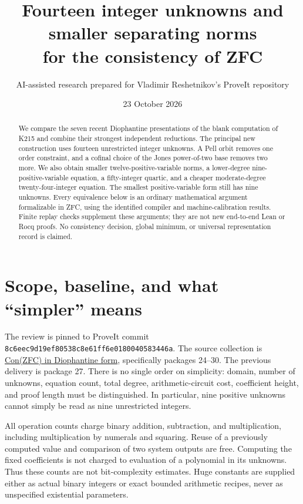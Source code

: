 \documentclass[11pt]{article}
\title{Fourteen integer unknowns and smaller separating norms\\for the consistency of ZFC}
\author{AI-assisted research prepared for Vladimir Reshetnikov's ProveIt repository}
\date{23 October 2026}
\begin{document}
\maketitle
\begin{abstract}
We compare the seven recent Diophantine presentations of the blank computation of K215 and combine their strongest independent reductions. The principal new construction uses fourteen unrestricted integer unknowns. A Pell orbit removes one order constraint, and a cofinal choice of the Jones power-of-two base removes two more. We also obtain smaller twelve-positive-variable norms, a lower-degree nine-positive-variable equation, a fifty-integer quartic, and a cheaper moderate-degree twenty-four-integer equation. The smallest positive-variable form still has nine unknowns. Every equivalence below is an ordinary mathematical argument formalizable in ZFC, using the identified compiler and machine-calibration results. Finite replay checks supplement these arguments; they are not new end-to-end Lean or Rocq proofs. No consistency decision, global minimum, or universal representation record is claimed.
\end{abstract}

\section{Scope, baseline, and what ``simpler'' means}
The review is pinned to ProveIt commit
\texttt{8c6eec9d19ef80538c8e61ff6e0180040583446a}.
The source collection is
\href{https://github.com/VladimirReshetnikov/ProveIt/tree/8c6eec9d19ef80538c8e61ff6e0180040583446a/SetTheory/Cardinals/docs/reports/hilbert-tenth-problem/con-zfc-diophantine-forms}{Con(ZFC) in Diophantine form}, specifically packages 24--30.
The previous delivery is package 27. There is no single order on simplicity: domain, number of unknowns, equation count, total degree, arithmetic-circuit cost, coefficient height, and proof length must be distinguished. In particular, nine positive unknowns cannot simply be read as nine unrestricted integers.

All operation counts charge binary addition, subtraction, and multiplication, including multiplication by numerals and squaring. Reuse of a previously computed value and comparison of two system outputs are free. Computing the fixed coefficients is not charged to evaluation of a polynomial in its unknowns. Thus these counts are not bit-complexity estimates. Huge constants are supplied either as actual binary integers or exact bounded arithmetic recipes, never as unspecified existential parameters.
\end{document}
